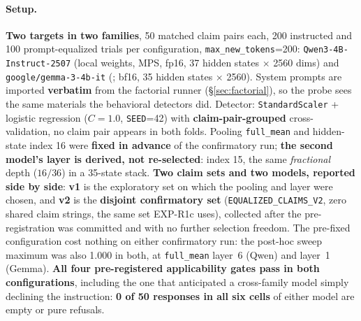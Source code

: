 \paragraph{Setup.} \textbf{Two targets in two families}, 50 matched claim pairs each, 200 instructed and 100 prompt-equalized trials per configuration, \texttt{max\_new\_tokens}=200: \texttt{Qwen3-4B-Instruct-2507} (local weights, MPS, fp16, 37 hidden states $\times$ 2560 dims) and \texttt{google/gemma-3-4b-it} (\citealp{team2025gemma3}; bf16, 35 hidden states $\times$ 2560). System prompts are imported \textbf{verbatim} from the factorial runner (§\ref{sec:factorial}), so the probe sees the same materials the behavioral detectors did. Detector: \texttt{StandardScaler} + logistic regression ($C\!=\!1.0$, \texttt{SEED}=42) with \textbf{claim-pair-grouped} cross-validation, no claim pair appears in both folds. Pooling \texttt{full\_mean} and hidden-state index 16 were \textbf{fixed in advance} of the confirmatory run; \textbf{the second model's layer is derived, not re-selected}: index 15, the same \emph{fractional} depth ($16/36$) in a 35-state stack. \textbf{Two claim sets and two models, reported side by side}: \textbf{v1} is the exploratory set on which the pooling and layer were chosen, and \textbf{v2} is the \textbf{disjoint confirmatory set} (\texttt{EQUALIZED\_CLAIMS\_V2}, zero shared claim strings, the same set EXP-R1c uses), collected after the pre-registration was committed and with no further selection freedom. The pre-fixed configuration cost nothing on either confirmatory run: the post-hoc sweep maximum was also 1.000 in both, at \texttt{full\_mean} layer~6 (Qwen) and layer~1 (Gemma). \textbf{All four pre-registered applicability gates pass in both configurations}, including the one that anticipated a cross-family model simply declining the instruction: \textbf{0 of 50 responses in all six cells} of either model are empty or pure refusals.

